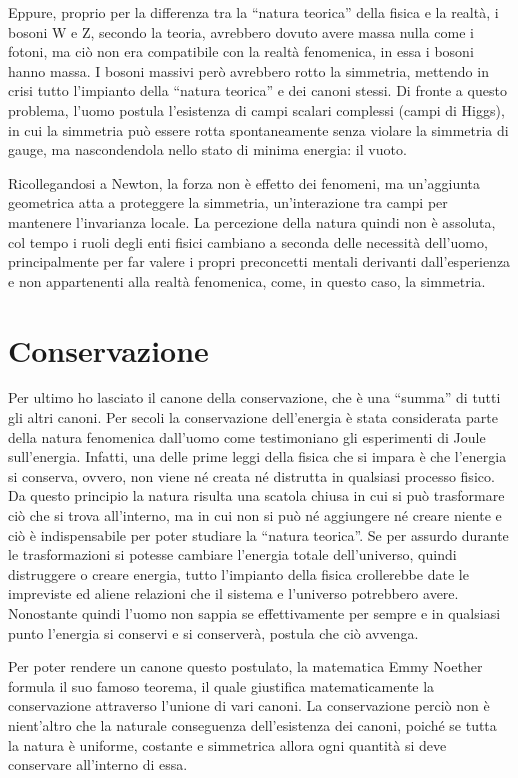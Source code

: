 \documentclass[11pt,a4paper]{article}
\begin{document}
Eppure, proprio per la differenza tra la “natura teorica” della fisica e la realtà, i bosoni W e Z, secondo la teoria, avrebbero dovuto avere massa nulla come i fotoni, ma ciò non era compatibile con la realtà fenomenica, in essa i bosoni hanno massa. I bosoni massivi però avrebbero rotto la simmetria, mettendo in crisi tutto l’impianto della “natura teorica” e dei canoni stessi. Di fronte a questo problema, l’uomo postula l’esistenza di campi scalari complessi (campi di Higgs), in cui la simmetria può essere rotta spontaneamente senza violare la simmetria di gauge, ma nascondendola nello stato di minima energia: il vuoto. 

Ricollegandosi a Newton, la forza non è effetto dei fenomeni, ma un’aggiunta geometrica atta a proteggere la simmetria, un’interazione tra campi per mantenere l’invarianza locale. La percezione della natura quindi non è assoluta, col tempo i ruoli degli enti fisici cambiano a seconda delle necessità dell’uomo, principalmente per far valere i propri preconcetti mentali derivanti dall’esperienza e non appartenenti alla realtà fenomenica, come, in questo caso, la simmetria. \section{Conservazione}

Per ultimo ho lasciato il canone della conservazione, che è una “summa” di tutti gli altri canoni. Per secoli la conservazione dell’energia è stata considerata parte della natura fenomenica dall’uomo come testimoniano gli esperimenti di Joule sull’energia. Infatti, una delle prime leggi della fisica che si impara è che l’energia si conserva, ovvero, non viene né creata né distrutta in qualsiasi processo fisico. Da questo principio la natura risulta una scatola chiusa in cui si può trasformare ciò che si trova all’interno, ma in cui non si può né aggiungere né creare niente e ciò è indispensabile per poter studiare la “natura teorica”. Se per assurdo durante le trasformazioni si potesse cambiare l’energia totale dell’universo, quindi distruggere o creare energia, tutto l’impianto della fisica crollerebbe date le impreviste ed aliene relazioni che il sistema e l’universo potrebbero avere. Nonostante quindi l’uomo non sappia se effettivamente per sempre e in qualsiasi punto l’energia si conservi e si conserverà, postula che ciò avvenga. 

Per poter rendere un canone questo postulato, la matematica Emmy Noether formula il suo famoso teorema, il quale giustifica matematicamente la conservazione attraverso l’unione di vari canoni. La conservazione perciò non è nient’altro che la naturale conseguenza dell’esistenza dei canoni, poiché se tutta la natura è uniforme, costante e simmetrica allora ogni quantità si deve conservare all’interno di essa. 
\end{document}
